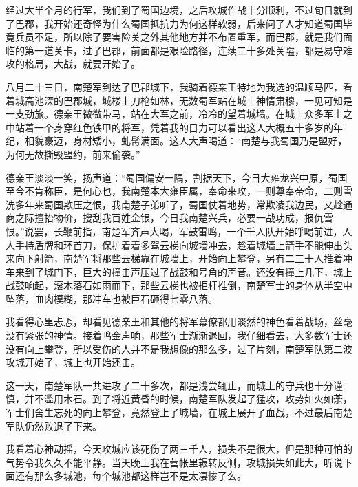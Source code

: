 经过大半个月的行军，我们到了蜀国边境，之后攻城作战十分顺利，不过旬日就到了巴郡，我开始还奇怪为什么蜀国抵抗力为何这样软弱，后来问了人才知道蜀国毕竟兵员不足，所以除了要害险关之外其他地方并不布置重军，而巴郡，就是我们面临的第一道关卡，过了巴郡，前面都是艰险路径，连续二十多处关隘，都是易守难攻的格局，大战，就要开始了。

八月二十三日，南楚军到达了巴郡城下，我骑着德亲王特地为我选的温顺马匹，看着城高池深的巴郡城，城楼上刀枪如林，无数蜀军站在城上神情肃穆，一见可知是一支劲旅。德亲王微微带马，站在大军之前，冷冷的望着城墙。在城上众多军士之中站着一个身穿红色铁甲的将军，凭着我的目力可以看出这人大概五十多岁的年纪，相貌豪迈，身材矮小，虬髯满面。这人大声喝道：“南楚与我蜀国乃是盟好，为何无故撕毁盟约，前来偷袭。”

德亲王淡淡一笑，扬声道：“蜀国偏安一隅，割据天下，今日大雍龙兴中原，蜀国至今不肯称臣，是何心也，我南楚本大雍臣属，奉命来攻，一则尊奉帝命，二则雪洗多年来蜀国欺压之恨，我南楚子弟听了，蜀国仗着地势，常欺凌我边民，又趁通商之际擅抬物价，搜刮我百姓金银，今日我南楚兴兵，必要一战功成，报仇雪恨。”说罢，长鞭前指，南楚军齐声大喝，军鼓雷鸣，一个千人队开始呼喝前进，人人手持盾牌和环首刀，保护着着多驾云梯向城墙冲去，趁着城墙上箭手不能伸出头来向下射箭，南楚军将那些云梯靠在城墙上，开始向上攀登，另有二三十人推着冲车来到了城门下，巨大的撞击声压过了战鼓和号角的声音。还没有撞上几下，城上战鼓响起，滚木落石如雨而下，那些云梯也被拒杆推倒，南楚军士的身体从半空中坠落，血肉模糊，那冲车也被巨石砸得七零八落。

我看得心里忐忑，却看见德亲王和其他的将军幕僚都用淡然的神色看着战场，丝毫没有紧张的神情。接着鸣金声响，那些军士渐渐退回，我仔细看去，大多数军士还没有向上攀登，所以受伤的人并不是我想像的那么多，过了片刻，南楚军队第二波攻城开始了，城上也开始还击。

这一天，南楚军队一共进攻了二十多次，都是浅尝辄止，而城上的守兵也十分谨慎，并不滥用木石。到了将近黄昏的时候，南楚军队发起了猛攻，攻势如火如荼，军士们舍生忘死的向上攀登，竟然登上了城墙，在城上展开了血战，不过最后南楚军队仍然败退了下来。

我看着心神动摇，今天攻城应该死伤了两三千人，损失不是很大，但是那种可怕的气势令我久久不能平静。当天晚上我在营帐里辗转反侧，攻城损失如此大，听说下面还有那么多城池，每个城池都这样岂不是太凄惨了么。

